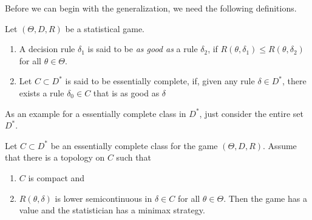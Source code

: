 Before we can begin with the generalization, we need the following definitions.
\begin{definition}Let $(\Theta,D,R)$ be a statistical game.
	\begin{enumerate}
	\item  A decision rule $\delta_1$ is said to be \emph{as good as} a rule $\delta_2$, if $R(\theta,\delta_1)\leq R(\theta,\delta_2)$ for all $\theta\in \Theta$.
	\item Let $C\subset D^\ast$ is said to be essentially complete, if, given any rule $\delta\in D^\ast$, there exists a rule $\delta_0\in C$ that is as good as $\delta$
	\end{enumerate}
\end{definition}
As an example for a essentially complete class in $D^\ast$, just consider the entire set $D^\ast$.

\begin{theorem}\label{thm:minimax}
	Let $C\subset D^\ast$ be an essentially complete class for the game $(\Theta, D, R)$. Assume that there is a topology on $C$ such that
	\begin{enumerate}
		\item $C$ is compact and
		\item $R(\theta,\delta)$ is lower semicontinuous in $\delta\in C$ for all $\theta\in \Theta$. Then the game has a value and the statistician has a minimax strategy.
	\end{enumerate}
\end{theorem}

